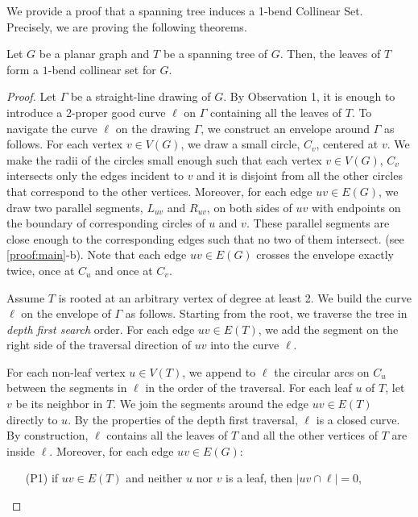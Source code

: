 We provide a proof that a spanning tree induces a 1-bend Collinear Set. Precisely, we are proving the following theorems.

\begin{thm} \label{app-main}

Let $G$ be a planar graph and $T$ be a spanning tree of $G$. Then, the leaves of $T$ form a $1$-bend collinear set for $G$.

\end{thm}

\begin{proof}

    Let $\Gamma$ be a straight-line drawing of $G$.
    By Observation 1, it is enough to introduce a 2-proper good curve $\ell$ on $\Gamma$ containing all the leaves of $T$. To navigate the curve $\ell$ on the drawing $\Gamma$, we construct an envelope around $\Gamma$ as follows. For each vertex $v \in V(G)$, we draw a small circle, $C_v$, centered at $v$. We make the radii of the circles small enough such that each vertex $v \in V(G)$, $C_v$ intersects only the edges incident to $v$ and it is disjoint from all the other circles that correspond to the other vertices. Moreover, for each edge $uv \in E(G)$, we draw two parallel segments, $L_{uv}$ and $R_{uv}$, on both sides of $uv$ with endpoints on the boundary of corresponding circles of $u$ and $v$. These parallel segments are close enough to the corresponding edges such that no two of them intersect. (see \cref{proof:main}-b). Note that each edge $uv \in E(G)$ crosses the envelope exactly twice, once at $C_u$ and once at $C_v$.

    Assume $T$ is rooted at an arbitrary vertex of degree at least 2. We build the curve $\ell$ on the envelope of $\Gamma$ as follows. Starting from the root, we traverse the tree in \textit{depth first search} order. For each edge $uv \in E(T)$, we add the segment on the right side of the traversal direction of $uv$ into the curve $\ell$.

    For each non-leaf vertex $u \in V(T)$, we append to $\ell$ the circular arcs on $C_u$ between the segments in $\ell$ in the order of the traversal. For each leaf $u$ of $T$, let $v$ be its neighbor in $T$. We join the segments around the edge $uv \in E(T)$ directly to $u$. By the properties of the depth first traversal, $\ell$ is a closed curve. By construction, $\ell$ contains all the leaves of $T$ and all the other vertices of $T$ are inside $\ell$. Moreover, for each edge $uv \in E(G)$:

    \begin{enumerate}
        \item [(P1)] if $uv \in E(T)$ and neither $u$ nor $v$ is a leaf, then $|uv \cap \ell| = 0$,


\end{enumerate}
\end{proof}
